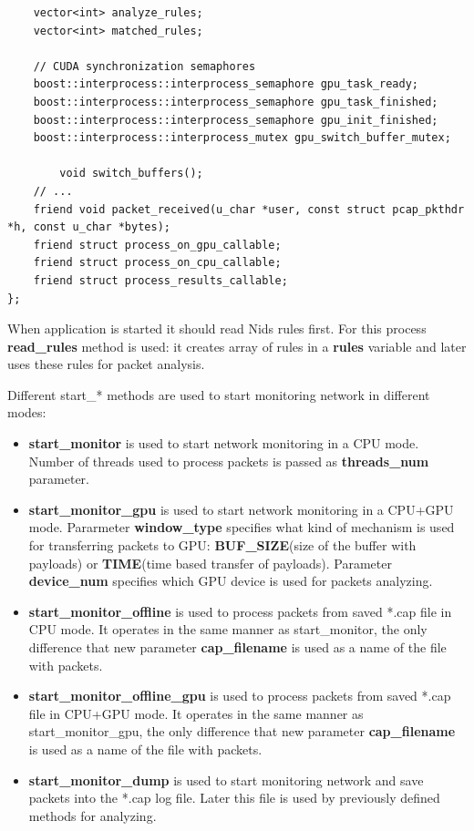\documentclass[thesis=M,english]{FITthesis}[2011/07/15]
\begin{document}
\begin{lstlisting}
    vector<int> analyze_rules;
    vector<int> matched_rules;

    // CUDA synchronization semaphores
    boost::interprocess::interprocess_semaphore gpu_task_ready;
    boost::interprocess::interprocess_semaphore gpu_task_finished;
    boost::interprocess::interprocess_semaphore gpu_init_finished;
    boost::interprocess::interprocess_mutex gpu_switch_buffer_mutex;

		void switch_buffers();
    // ...
    friend void packet_received(u_char *user, const struct pcap_pkthdr *h, const u_char *bytes);
    friend struct process_on_gpu_callable;
    friend struct process_on_cpu_callable;
    friend struct process_results_callable;
};\end{lstlisting}

When application is started it should read Nids rules first. For this process \textbf{read\_rules} method is used: it creates array of rules in a \textbf{rules} variable and later uses these rules for packet analysis.

Different start\_* methods are used to start monitoring network in different modes:
\begin{itemize}
\item \textbf{start\_monitor} is used to start network monitoring in a CPU mode. Number of threads used to process packets is passed as \textbf{threads\_num} parameter.
\item \textbf{start\_monitor\_gpu} is used to start network monitoring in a CPU+GPU mode. Pararmeter \textbf{window\_type} specifies what kind of mechanism is used for transferring packets to GPU: \textbf{BUF\_SIZE}(size of the buffer with payloads) or \textbf{TIME}(time based transfer of payloads). Parameter \textbf{device\_num} specifies which GPU device is used for packets analyzing.
\item \textbf{start\_monitor\_offline} is used to process packets from saved *.cap file in CPU mode. It operates in the same manner as start\_monitor, the only difference that new parameter \textbf{cap\_filename} is used as a name of the file with packets.
\item \textbf{start\_monitor\_offline\_gpu} is used to process packets from saved *.cap file in CPU+GPU mode. It operates in the same manner as start\_monitor\_gpu, the only difference that new parameter \textbf{cap\_filename} is used as a name of the file with packets.
\item \textbf{start\_monitor\_dump} is used to start monitoring network and save packets into the *.cap log file. Later this file is used by previously defined methods for analyzing.
\end{itemize}
\end{document}
